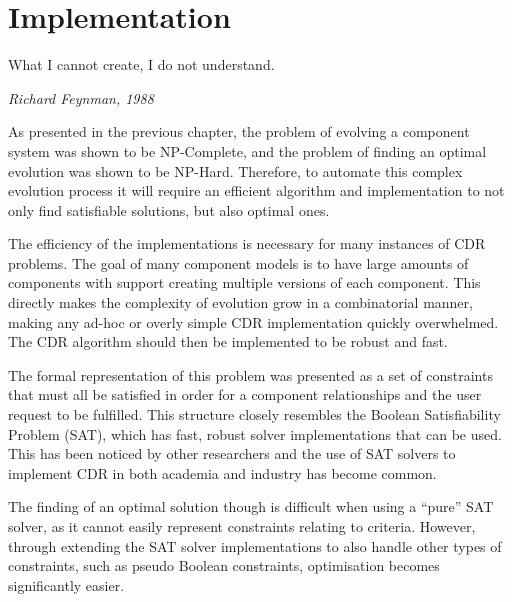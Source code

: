 \chapter{Implementation}
\label{implementation}
\epigraph{What I cannot create, I do not understand.}
{\textit{Richard Feynman, 1988}}

As presented in the previous chapter, the problem of evolving a component system was shown to be NP-Complete, and the problem of finding an optimal evolution was shown to be NP-Hard.
Therefore, to automate this complex evolution process it will require an efficient algorithm and implementation to not only find satisfiable solutions, but also optimal ones. 

The efficiency of the implementations is necessary for many instances of CDR problems.
The goal of many component models is to have large amounts of components with support creating multiple versions of each component.
This directly makes the complexity of evolution grow in a combinatorial manner, making any ad-hoc or overly simple CDR implementation quickly overwhelmed.
The CDR algorithm should then be implemented to be robust and fast.

The formal representation of this problem was presented as a set of constraints that must all be satisfied in order for a component relationships and the user request to be fulfilled.
This structure closely resembles the Boolean Satisfiability Problem (SAT), which has fast, robust solver implementations that can be used.
This has been noticed by other researchers \citep{leberre2008,Mancinelli2006} 
and the use of SAT solvers to implement CDR in both academia \citep{abate2011} and industry \citep{leBerre2010} has become common.

The finding of an optimal solution though is difficult when using a ``pure'' SAT solver, as it cannot easily represent constraints relating to criteria. 
However, through extending the SAT solver implementations to also handle other types of constraints, such as pseudo Boolean constraints, optimisation becomes significantly easier.

